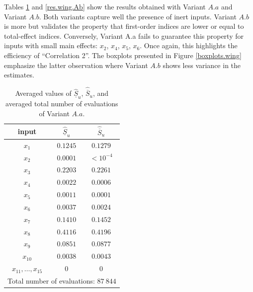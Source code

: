 Tables \ref{res.wing.Aa} and \ref{res.wing.Ab} show the results obtained with Variant $A.a$ and  Variant $A.b$. Both variants capture well the presence of inert inputs. Variant $A.b$ is more  but validates the property that first-order indices are lower or equal to total-effect indices. Conversely, Variant A.a fails to guarantee this property for inputs with small main effects: $x_2$, $x_4$, $x_5$, $x_6$. Once again, this highlights the efficiency of ``Correlation 2''. The boxplots presented in Figure \ref{boxplots.wing} emphasize the latter observation where Variant $A.b$ shows less variance in the estimates. 

\begin{table}[t]
\caption{Averaged values of $\widehat{\underline{S}}_u$, ${\widehat{\overline{S}}_u}$, and averaged total number of evaluations of Variant $A.a$.}
\centering
\begin{tabular}{ccc}
\hline
 input & $\widehat{\underline{S}}_u$ & $\widehat{\overline{S}}_u$ \\ \hline
 $x_1$ & $0.1245$ & $0.1279$  \\ \hline
 $x_2$ & $0.0001$ & $< 10^{-4}$  \\ \hline
 $x_3$ & $0.2203$ & $0.2261$  \\ \hline
 $x_4$ & $0.0022$ & $0.0006$  \\ \hline
 $x_5$ & $0.0011$ & $0.0001$  \\ \hline
 $x_6$ & $0.0037$ & $0.0024$  \\ \hline 
 $x_7$ & $0.1410$ & $0.1452$  \\ \hline
 $x_8$ & $0.4116$ & $0.4196$  \\ \hline
 $x_9$ & $0.0851$ & $0.0877$  \\ \hline
 $x_{10}$ & $0.0038$ & $0.0043$  \\ \hline
 $x_{11},\dots,x_{15}$ & $0$ & $0$  \\ \hline
\hline
\multicolumn{3}{l}{Total number of evaluations: $87 \ 844$} \\ \hline 
\end{tabular}
\label{res.wing.Aa}
\end{table}
